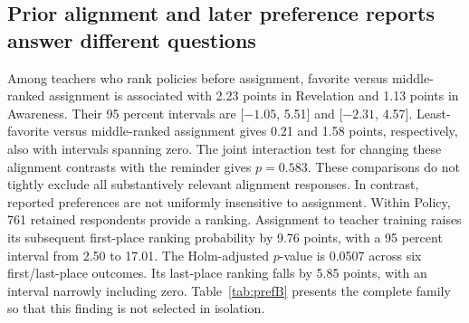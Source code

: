 \subsection{Prior alignment and later preference reports answer different questions}
Among teachers who rank policies before assignment, favorite versus middle-ranked assignment is associated with 2.23 points in Revelation and 1.13 points in Awareness. Their 95 percent intervals are [$-1.05$, 5.51] and [$-2.31$, 4.57]. Least-favorite versus middle-ranked assignment gives 0.21 and 1.58 points, respectively, also with intervals spanning zero. The joint interaction test for changing these alignment contrasts with the reminder gives $p=0.583$. These comparisons do not tightly exclude all substantively relevant alignment responses.
In contrast, reported preferences are not uniformly insensitive to assignment. Within Policy, 761 retained respondents provide a ranking. Assignment to teacher training raises its subsequent first-place ranking probability by 9.76 points, with a 95 percent interval from 2.50 to 17.01. The Holm-adjusted $p$-value is 0.0507 across six first/last-place outcomes. Its last-place ranking falls by 5.85 points, with an interval narrowly including zero. Table~\ref{tab:prefB} presents the complete family so that this finding is not selected in isolation.

